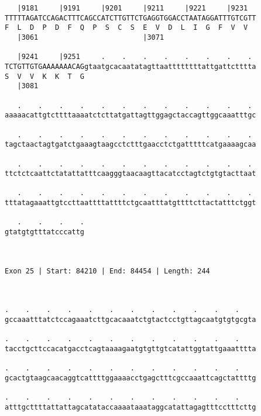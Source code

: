 \documentclass{article}
\begin{document}
\begin{Verbatim}
   |9181     |9191     |9201     |9211     |9221     |9231  
TTTTTAGATCCAGACTTTCAGCCATCTTGTTCTGAGGTGGACCTAATAGGATTTGTCGTT
F  L  D  P  D  F  Q  P  S  C  S  E  V  D  L  I  G  F  V  V  
   |3061                         |3071                      
  
   |9241     |9251     .    .    .    .    .    .    .    . 
TCTGTTGTGAAAAAAACAGgtaatgcacaatatagttaattttttttattgattctttta
S  V  V  K  K  T  G                                         
   |3081                                                    
  
   .    .    .    .    .    .    .    .    .    .    .    . 
aaaaacattgtcttttaaaatctcttatgattagttggagctaccagttggcaaatttgc
                                                            
   .    .    .    .    .    .    .    .    .    .    .    . 
tagctaactagtgatctgaaagtaagcctctttgaacctctgatttttcatgaaaagcaa
                                                            
   .    .    .    .    .    .    .    .    .    .    .    . 
ttctctcaattctatattatttcaagggtaacaagttacatcctagtctgtgtacttaat
                                                            
   .    .    .    .    .    .    .    .    .    .    .    . 
tttatagaaattgtccttaattttattttctgcaatttatgttttcttactatttctggt
                                                            
   .    .    .    .
gtatgtgtttatcccattg
                   
                   
 
Exon 25 | Start: 84210 | End: 84454 | Length: 244



.    .    .    .    .    .    .    .    .    .    .    .    
gccaaatttatctccagaaatcttgcacaaatctgtactcctgttagcaatgtgtgcgta
                                                            
.    .    .    .    .    .    .    .    .    .    .    .    
tacctgcttccacatgacctcagtaaaagaatgtgttgtcatattggtattgaaatttta
                                                            
.    .    .    .    .    .    .    .    .    .    .    .    
gcactgtaagcaacaggtcattttggaaaacctgagctttcgccaaattcagctattttg
                                                            
.    .    .    .    .    .    .    .    .    .    .    .    
atttgcttttattattagcatataccaaaataaataggcatattagagtttcctttcttg
                                                            

\end{Verbatim}
\end{document}
